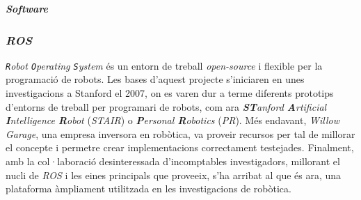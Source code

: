 \documentclass[12pt,a4paper,final,twoside]{article}
\begin{document}



\vspace{20pt}
\textbf{\textit{Software}}
\label{Software}




  


\subsubsection{\textit{ROS}}
\label{ROS}

\textit{\texttt{R}obot \texttt{O}perating \texttt{S}ystem} \cite{ROS} és un entorn de treball \textit{open-source} i flexible per la programació de robots. Les bases d'aquest projecte s'iniciaren en unes investigacions a Stanford el 2007, on es varen dur a terme diferents prototips d'entorns de treball per programari de robots, com ara \textit{\textbf{ST}anford \textbf{A}rtificial \textbf{I}ntelligence \textbf{R}obot} (\textit{STAIR}) o \textit{\textbf{P}ersonal \textbf{R}obotics} (\textit{PR}). Més endavant, \textit{Willow Garage}, una empresa inversora en robòtica, va proveir recursos per tal de millorar el concepte i permetre crear implementacions correctament testejades. Finalment, amb la col·laboració desinteressada d'incomptables investigadors, millorant el nucli de \textit{ROS} i les eines principals que proveeix, s'ha arribat al que és ara, una plataforma àmpliament utilitzada en les investigacions de robòtica.
\end{document}
